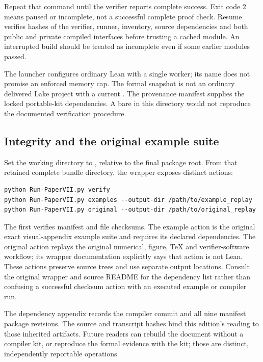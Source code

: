 Repeat that command until the verifier reports complete success. Exit code 2 means paused or incomplete, not a successful complete proof check. Resume verifies hashes of the verifier, runner, inventory, source dependencies and both public and private compiled interfaces before trusting a cached module. An interrupted build should be treated as incomplete even if some earlier modules passed.

The  launcher configures ordinary Lean with a single worker; its name does not promise an enforced memory cap. The formal snapshot is not an ordinary delivered Lake project with a current . The provenance manifest supplies the locked portable-kit dependencies. A bare  in this directory would not reproduce the documented verification procedure.

\subsection{Integrity and the original example suite}
Set the working directory to , relative to the final package root. From that retained complete bundle directory, the wrapper exposes distinct actions:

\begin{Verbatim}[fontsize=\small,breaklines=true,breakanywhere=true]
python Run-PaperVII.py verify
python Run-PaperVII.py examples --output-dir /path/to/example_replay
python Run-PaperVII.py original --output-dir /path/to/original_replay
\end{Verbatim}

The first verifies manifest and file checksums. The example action is the original exact visual-appendix example suite and requires its declared dependencies. The original action replays the original numerical, figure, TeX and verifier-software workflow; its wrapper documentation explicitly says that action is not Lean. These actions preserve source trees and use separate output locations. Consult the original wrapper and source README for the dependency list rather than confusing a successful checksum action with an executed example or compiler run.

The dependency appendix records the compiler commit and all nine manifest package revisions. The source and transcript hashes bind this edition's reading to those inherited artifacts. Future readers can rebuild the document without a compiler kit, or reproduce the formal evidence with the kit; those are distinct, independently reportable operations.
